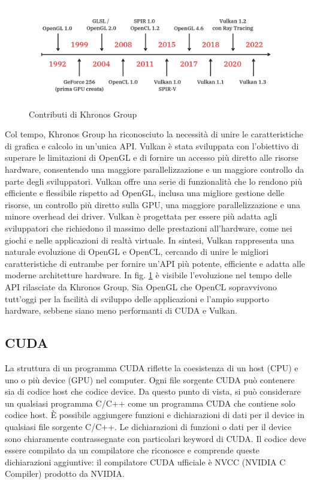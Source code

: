 \begin{figure}[ht]
    \centering
    \includegraphics[width=.9\linewidth]{images/chapter2/vulkan_history.png}
    \caption{Contributi di Khronos Group}
    \label{fig:vulkan_history}
\end{figure}

Col tempo, Khronos Group ha riconosciuto la necessità di unire le caratteristiche di grafica e calcolo in un'unica API. Vulkan è stata sviluppata con l'obiettivo di superare le limitazioni di OpenGL e di fornire un accesso più diretto alle risorse hardware, consentendo una maggiore parallelizzazione e un maggiore controllo da parte degli sviluppatori. Vulkan offre una serie di funzionalità che lo rendono più efficiente e flessibile rispetto ad OpenGL, inclusa una migliore gestione delle risorse, un controllo più diretto sulla GPU, una maggiore parallelizzazione e una minore overhead dei driver. Vulkan è progettata per essere più adatta agli sviluppatori che richiedono il massimo delle prestazioni all'hardware, come nei giochi e nelle applicazioni di realtà virtuale. In sintesi, Vulkan rappresenta una naturale evoluzione di OpenGL e OpenCL, cercando di unire le migliori caratteristiche di entrambe per fornire un'API più potente, efficiente e adatta alle moderne architetture hardware. In fig. \ref{fig:vulkan_history} è visibile l'evoluzione nel tempo delle API rilasciate da Khronos Group. Sia OpenGL che OpenCL sopravvivono tutt'oggi per la facilità di sviluppo delle applicazioni e l'ampio supporto hardware, sebbene siano meno performanti di CUDA e Vulkan.

\subsection[CUDA]{CUDA}

La struttura di un programma CUDA riflette la coesistenza di un host (CPU) e uno o più device (GPU) nel computer. Ogni file sorgente CUDA può contenere sia di codice host che codice device. Da questo punto di vista, si può considerare un qualsiasi programma C/C++ come un programma CUDA che contiene solo codice host. È possibile aggiungere funzioni e dichiarazioni di dati per il device in qualsiasi file sorgente C/C++. Le dichiarazioni di funzioni o dati per il device sono chiaramente contrassegnate con particolari keyword di CUDA. Il codice deve essere compilato da un compilatore che riconosce e comprende queste dichiarazioni aggiuntive: il compilatore CUDA ufficiale è NVCC (NVIDIA C Compiler) prodotto da NVIDIA.

